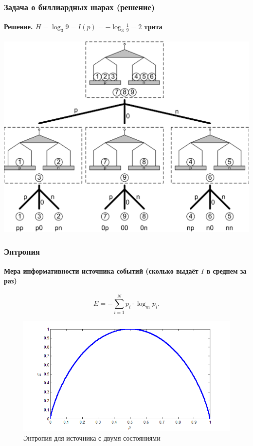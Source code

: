 \begin{frame}
    \frametitle{Задача о биллиардных шарах (решение)}
    \framesubtitle{Решение. $H=\log_{3}9=I(p)=-\log_{3}\frac{1}{9}=2$ трита}
    
    \begin{center}
        \includegraphics[width=.7\textwidth]{fig/trit}  
    \end{center} 
\end{frame}

\begin{frame}
    \frametitle{Энтропия}
    \framesubtitle{Мера информативности источника событий (сколько выдаёт $I$ в среднем за раз)}
    
    \[
        E=-\sum_{i=1}^{N}p_{i}\cdot \log_{m}p_i.
        \label{eq:e}
    \]
    
    \begin{figure}[!ht]
        \centering
        \includegraphics[width=.6\textwidth]{fig/ecoin} 
        \caption{Энтропия для источника с двумя состояниями}\label{pict:ecoin}
    \end{figure} 
\end{frame}

